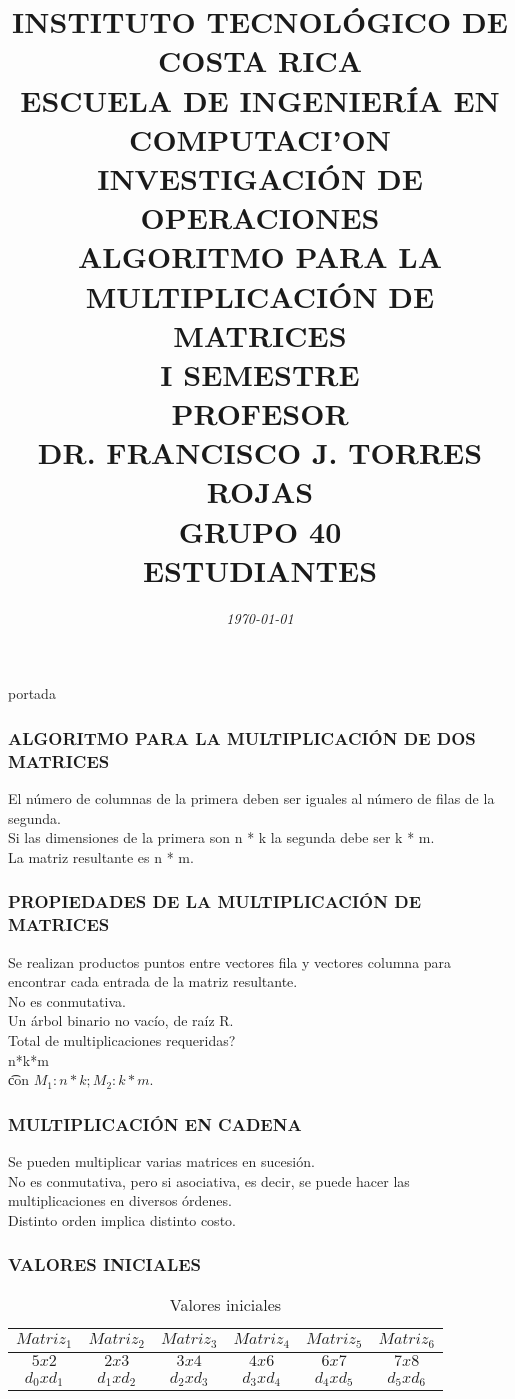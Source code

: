 \documentclass[10]{beamer}
\title{{\color{WHITE} \large \textbf{INSTITUTO TECNOL\'OGICO DE COSTA RICA}} \\ \vspace{0.02cm} 
{\color{WHITE} \large \textbf{ESCUELA DE INGENIER\'IA EN COMPUTACI'ON }} \\ \vspace{0.02cm} 
{\color{WHITE} \large \textbf{INVESTIGACI\'ON DE OPERACIONES  }} \\ \vspace{0.02cm} 
{\color{WHITE} \large \textbf{ALGORITMO PARA LA \\ MULTIPLICACI\'ON DE MATRICES  }} \\ \vspace{0.02cm} 
{\color{WHITE} \large \textbf{I SEMESTRE  }}\\ \vspace{0.02cm}
{\color{WHITE} \large \textbf{PROFESOR}} \\ \vspace{0.02cm}
{\color{WHITE} \large DR. FRANCISCO J. TORRES ROJAS  } \\ \vspace{0.02cm}
{\color{WHITE} \large \textbf{GRUPO 40}} \\ \vspace{0.01cm}
{\color{WHITE} \large \textbf{ESTUDIANTES} }}
\date{\em \color{WHITE} \today}
\begin{document}
\begin{frame}
\color{white}
\titlepage portada
\end{frame} 
\begin{frame}
\color{white}
\frametitle{ALGORITMO PARA LA MULTIPLICACI\'ON DE DOS MATRICES}
El n\'umero de columnas de la primera deben ser iguales al n\'umero de filas de la segunda.
\\ Si las dimensiones de la primera son n * k la segunda debe ser k * m.
\\ La matriz resultante es n * m.
\end{frame} 
\begin{frame}
\color{white}
\frametitle{PROPIEDADES DE LA MULTIPLICACI\'ON DE MATRICES}
Se realizan productos puntos entre vectores fila y vectores columna para encontrar cada entrada de la matriz resultante.
\\ No es conmutativa.
\\Un \'arbol binario no vac\'io, de ra\'iz R.
\\ Total de multiplicaciones requeridas? \\ n*k*m  \\ \t con $M_1:n*k; M_2: k*m$.
\end{frame} 
\begin{frame}
\color{white}
\frametitle{MULTIPLICACI\'ON EN CADENA}
Se pueden multiplicar varias matrices en sucesi\'on.
\\ No es conmutativa, pero si asociativa, es decir, se puede hacer las multiplicaciones en diversos \'ordenes.
\\ Distinto orden implica distinto costo.
\end{frame} 
\begin{frame}\frametitle{VALORES INICIALES}
 \color{white}
\begin{table}
 \begin{tabular}{ c | c  | c  | c  | c  | c }
 \\  $Matriz_1$ & $Matriz_2$   & $Matriz_3$   & $Matriz_4$   & $Matriz_5$   & $Matriz_6$  \\ 
 \hline \hline 
 $5x2$& $2x3$& $3x4$& $4x6$& $6x7$& $7x8$ \\ 
  $d_0xd_1$& $d_1xd_2$& $d_2xd_3$& $d_3xd_4$& $d_4xd_5$& $d_5xd_6$ 
 \end{tabular}
 \color{white}
\caption{Valores iniciales}
 \end{table}
 \end{frame} 
\end{document}
